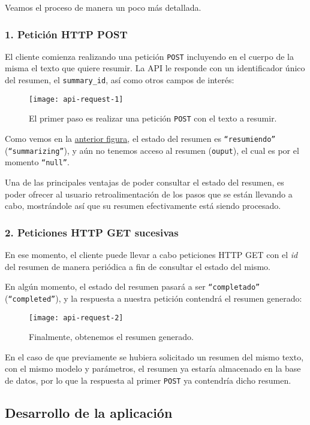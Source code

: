 Veamos el proceso de manera un poco más detallada.

\subsubsection{1. Petición HTTP POST}

El cliente comienza realizando una petición \texttt{POST} incluyendo en el cuerpo de la misma el texto que quiere resumir. La API le responde con un identificador único del resumen, el \texttt{summary\_id}, así como otros campos de interés:

\begin{figure}[h]
	\centering
	\texttt{[image: api-request-1]}
	\caption[Primer paso: realizar una petición POST.]{El primer paso es realizar una petición \texttt{POST} con el texto a resumir.}
	\label{fig:api-primer-paso}
\end{figure}

Como vemos en la \hyperref[fig:api-primer-paso]{anterior figura}, el estado del resumen es \texttt{``resumiendo''} (\texttt{``summarizing''}), y aún no tenemos acceso al resumen (\texttt{ouput}), el cual es por el momento \texttt{``null''}.

Una de las principales ventajas de poder consultar el estado del resumen, es poder ofrecer al usuario retroalimentación de los pasos que se están llevando a cabo, mostrándole así que su resumen efectivamente está siendo procesado.

\subsubsection{2. Peticiones HTTP GET sucesivas}

En ese momento, el cliente puede llevar a cabo peticiones HTTP GET con el \emph{id} del resumen de manera periódica a fin de consultar el estado del mismo.

En algún momento, el estado del resumen pasará a ser \texttt{``completado''} (\texttt{``completed''}), y la respuesta a nuestra petición contendrá el resumen generado:

\begin{figure}[h]
	\centering
	\texttt{[image: api-request-2]}
	\caption{Finalmente, obtenemos el resumen generado.}
\end{figure}

En el caso de que previamente se hubiera solicitado un resumen del mismo texto, con el mismo modelo y parámetros, el resumen ya estaría almacenado en la base de datos, por lo que la respuesta al primer \texttt{POST} ya contendría dicho resumen.


\subsection{Desarrollo de la aplicación}